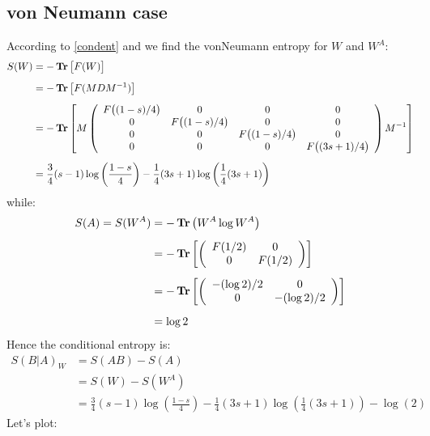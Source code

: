 \subsection{von Neumann case}
\noindent
According to \eqref{condent} and  we find the vonNeumann entropy for $W$ and $W^A$:
\begin{align}
S(W)&=-\operatorname{\textup{\textbf{Tr}}} \big[ F(W) \big]
\nonumber \\[0.5em] &= -\operatorname{\textup{\textbf{Tr}}} \big[F(MDM^{-1})\big] \nonumber \\[0.5em] &= -\operatorname{\textup{\textbf{Tr}}} \left[ M
\left(
\begin{array}{cccc}
F\big((1-s)/4\big) & 0 & 0 & 0 \\
 0 & F\big((1-s)/4\big) & 0 & 0 \\
 0 & 0 & F\big((1-s)/4\big) & 0 \\
 0 & 0 & 0 & F\big((3s+1)/4\big) \\
\end{array}
\right)
M^{-1} \right]
\nonumber \\[0.5em] &=
\frac{3}{4} (s-1) \log \left(\frac{1-s}{4}\right)-\frac{1}{4} (3 s+1) \log \left(\frac{1}{4} (3 s+1)\right)
\end{align}
while:
\begin{align}
S(A)=S(W^A)&=-\operatorname{\textup{\textbf{Tr}}} \big(W^A \log W^A \big) \nonumber \\[0.5em] 
&=-\operatorname{\textup{\textbf{Tr}}}\left[\left( \begin{array}{cccc}
 F(1/2) & 0  \\
 0 & F(1/2) \\
\end{array}
\right) \right]
\nonumber \\[0.5em] &=-\operatorname{\textup{\textbf{Tr}}}\left[\left( \begin{array}{cccc}
 -(\log 2)/2 & 0  \\
 0 & -(\log 2)/2 \\
\end{array}
\right) \right]
\nonumber \\[0.5em] &= \log2
\end{align}
Hence the conditional entropy is:
\begin{align}
S(B|A)_{W}&=S(AB)-S(A)
\nonumber \\[0.5em] &= S(W)-S(W^A)
\nonumber \\[0.5em] &= 
\frac{3}{4} (s-1) \log \left(\frac{1-s}{4}\right)-\frac{1}{4} (3 s+1) \log \left(\frac{1}{4} (3 s+1)\right)-\log (2)
\end{align}
Let's plot:
